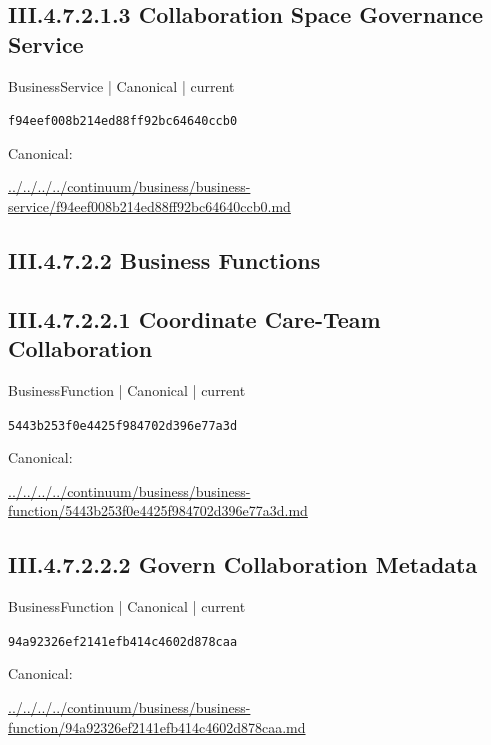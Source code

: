 \documentclass[10pt,a4paper]{article}
\begin{document}
\subsection*{III.4.7.2.1.3 Collaboration Space Governance Service}
\label{element-f94eef008b214ed88ff92bc64640ccb0}
{\small BusinessService | Canonical | current}\par
\texttt{f94eef008b214ed88ff92bc64640ccb0}\par
Canonical: \par
{\footnotesize\url{../../../../continuum/business/business-service/f94eef008b214ed88ff92bc64640ccb0.md}}\par
\subsection*{III.4.7.2.2 Business Functions}
\subsection*{III.4.7.2.2.1 Coordinate Care-Team Collaboration}
\label{element-5443b253f0e4425f984702d396e77a3d}
{\small BusinessFunction | Canonical | current}\par
\texttt{5443b253f0e4425f984702d396e77a3d}\par
Canonical: \par
{\footnotesize\url{../../../../continuum/business/business-function/5443b253f0e4425f984702d396e77a3d.md}}\par
\subsection*{III.4.7.2.2.2 Govern Collaboration Metadata}
\label{element-94a92326ef2141efb414c4602d878caa}
{\small BusinessFunction | Canonical | current}\par
\texttt{94a92326ef2141efb414c4602d878caa}\par
Canonical: \par
{\footnotesize\url{../../../../continuum/business/business-function/94a92326ef2141efb414c4602d878caa.md}}\par
\end{document}
